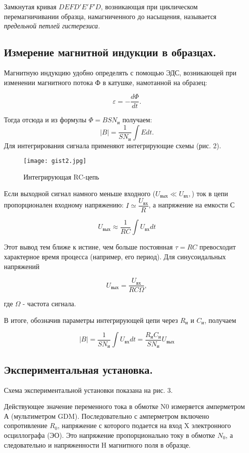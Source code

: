 Замкнутая кривая $DEFD'E'F'D$, возникающая при циклическом
перемагничивании образца, намагниченного до насыщения, называется \textit{предельной петлей гистерезиса.}


\subsection{Измерение магнитной индукции в образцах.}
Магнитную индукцию удобно определять с помощью ЭДС, возникающей при изменении магнитного потока Ф в катушке, намотанной на образец:

$$\varepsilon = -\frac{d\Phi}{dt}.$$

Тогда отсюда и из формулы $\Phi=BSN_\text{и}$ получаем:
    $$|B|=\dfrac{1}{SN_\text{и}}\int Edt.$$
Для интегрирования сигнала применяют интегрирующие схемы (рис. 2).

    \begin{wrapfigure}{l}{0.6\textwidth}
    \centering
    \vspace{-20pt}
        \texttt{[image: gist2.jpg]}
    \label{fig:sdfsafd}
    \vspace{-10pt}
    \caption{Интегрирующая RC-цепь}
\end{wrapfigure}

Если выходной сигнал намного меньше входного ($U_\text{вых}\ll U_\text{вх},$) ток в цепи пропорционален входному напряжению: $I\simeq\dfrac{U_\text{вх}}{R}$, а напряжение на емкости С

$$U_\text{вых} \approx \frac{1}{RC} \int U_\text{вх}dt$$

Этот вывод тем ближе к истине, чем больше постоянная $\tau=RC$ превосходит характерное время процесса (например, его период). Для синусоидальных напряжений

$$U_\text{вых} = \frac{U_\text{вх}}{RC\Omega},$$

где $\Omega$ - частота сигнала.

В итоге, обозначив параметры интегрирующей цепи через $R_\text{и}$ и $C_\text{и}$, получаем

$$ |B| = \frac{1}{SN_\text{и}} \int U_\text{вх}dt = \frac{R_\text{и}C_\text{и}}{SN_\text{и}}U_\text{вых}$$

\subsection{Экспериментальная установка.}
Схема экспериментальной установки показана на рис. 3.

Действующее значение переменного тока в обмотке N0 измеряется амперметром А (мультиметром GDM). Последовательно с амперметром включено сопротивление $R_{0}$, напряжение с которого подается на вход X электронного осциллографа (ЭО). Это напряжение пропорционально току в обмотке $N_{0}$, а следовательно и напряженности H магнитного поля в образце.

